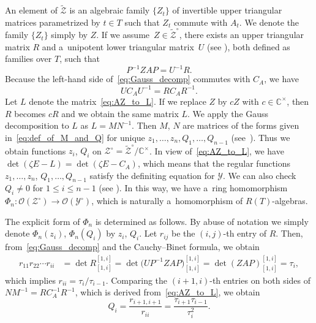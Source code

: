 \documentclass[pdftex]{sigma}
\numberwithin{equation}{section}
\newcommand{\C}{\mathbb{C}}
\newcommand{\Rep}{{R(T)}}
\theoremstyle{definition}
\begin{document}
An element of $\tilde{\mathscr{Z}}$
is an algebraic family $\{Z_t\}$ of invertible
upper triangular matrices
parame\-trized by $t\in T$ such that $Z_t$ commute with $A_t$.
We denote the family $\{Z_t\}$ simply by $Z$.
If we assume~${Z\in \tilde{\mathscr{Z}}^\circ}$,
there exists
an upper triangular matrix $R$
and a~unipotent lower triangular matrix~$U$ (see \cite[Proposition 3.2]{IIM}), both defined as families over $T$, such that \begin{equation}\label{eq:Gauss_decomp}
P^{-1}ZAP=U^{-1}R.
\end{equation}
Because the left-hand side of~\eqref{eq:Gauss_decomp} commutes with $C_A$, we have
\begin{equation}\label{eq:AZ_to_L} UC_AU^{-1}=RC_AR^{-1}.
\end{equation}
Let $L$ denote the matrix~\eqref{eq:AZ_to_L}.
If we replace $Z$ by $cZ$ with $c\in \C^\times$,
then $R$ becomes $cR$ and we obtain the same matrix $L$.
We apply the Gauss decomposition to
$L$ as $L=MN^{-1}$. Then $M$, $N$ are matrices of the forms given in~\eqref{eq:def_of_M_and_Q} for unique $z_1,\dots,z_n, Q_1,\dots,Q_{n-1}$ (see~\cite[Section~3.2]{IIM}).
Thus we obtain
functions
$z_i$, $Q_i$
on $\mathscr{Z}^\circ=\tilde{\mathscr{Z}}^\circ/\C^{\times}$.
In view of~\eqref{eq:AZ_to_L},
we have~${\det(\zeta E-L)
=\det(\zeta E-C_A)}$, which means that
the regular functions $z_1,\dots,z_n$, $Q_1,\dots,\allowbreak Q_{n-1}$
satisfy the definiting equation for $\mathscr{Y}$.
We can also check $Q_i\ne 0$
for $1\le i\le n-1$ (see \cite[Section~3.5]{IIM}).
In this way, we have a~ring homomorphism
$\Phi_n\colon \mathscr{O}(\mathscr{Z}^\circ)\rightarrow\mathscr{O}(\mathscr{Y}^\circ)$, which is naturally a~homomorphism of $\Rep$-algebras.

The explicit form of $\Phi_n$
is determined as follows.
By abuse of notation
we simply denote $\Phi_n(z_i)$, $\Phi_n(Q_i)$ by $z_i$, $Q_i$.
Let $r_{ij}$ be the $(i,j)$-th entry of $R$.
Then, from~\eqref{eq:Gauss_decomp} and the Cauchy--Binet formula, we obtain
\begin{equation}\label{eq:r_to_minor}
\begin{aligned}
r_{11}r_{22}\cdots r_{ii}
&=
\det R^{[1,i]}_{[1,i]}=
\det\bigl(UP^{-1}ZAP\bigr)^{[1,i]}_{[1,i]}
=\det(ZAP)^{[1,i]}_{[1,i]}=\tau_i,
\end{aligned}
\end{equation}
which implies $r_{ii}=\tau_{i}/\tau_{i-1}$.
Comparing the $(i+1,i)$-th entries on both sides of
$
NM^{-1}=RC_A^{-1}R^{-1}
$, which is derived from~\eqref{eq:AZ_to_L}, we obtain
\begin{equation}\label{eq:Q_to_tau}
Q_i=\frac{r_{i+1,i+1}}{r_{ii}}=\frac{\tau_{i+1}\tau_{i-1}}{\tau_i^2}.
\end{equation}
\end{document}
